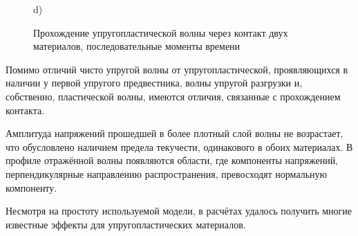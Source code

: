 \begin{figure}
\begin{minipage}{0.35\linewidth}
\end{minipage}
\hfill
\begin{minipage}{0.35\linewidth}
 d)\\
\end{minipage}
\caption{Прохождение упругопластической волны через контакт двух материалов, последовательные моменты времени}
\label{pic:pl-contact}
\end{figure}

Помимо отличий чисто упругой волны от упругопластической, проявляющихся в наличии у первой упругого предвестника, волны упругой разгрузки и, собственно, пластической волны, имеются отличия, связанные с прохождением контакта. 

Амплитуда напряжений прошедшей в более плотный слой волны не возрастает, что обусловлено наличием предела текучести, одинакового в обоих материалах. В профиле отражённой волны появляются области, где компоненты напряжений, перпендикулярные направлению распространения, превосходят нормальную компоненту.

Несмотря на простоту используемой модели, в расчётах удалось получить многие известные эффекты для упругопластических материалов.